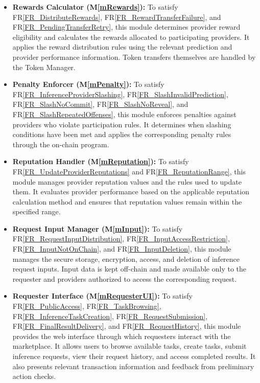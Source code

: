 \documentclass[12pt, titlepage]{article}
\newcommand{\mref}[1]{M\ref{#1}}
\newcommand{\rref}[1]{FR\ref{#1}}
\begin{document}
\begin{itemize}
    \item \textbf{Rewards Calculator (\mref{mRewards}):}
    To satisfy \rref{FR_DistributeRewards},
    \rref{FR_RewardTransferFailure}, and
    \rref{FR_PendingTransferRetry}, this module determines provider
    reward eligibility and calculates the rewards allocated to
    participating providers. It applies the reward distribution rules
    using the relevant prediction and provider performance information.
    Token transfers themselves are handled by the Token Manager.

    \item \textbf{Penalty Enforcer (\mref{mPenalty}):}
    To satisfy \rref{FR_InferenceProviderSlashing},
    \rref{FR_SlashInvalidPrediction},
    \rref{FR_SlashNoCommit},
    \rref{FR_SlashNoReveal}, and
    \rref{FR_SlashRepeatedOffenses}, this module enforces penalties
    against providers who violate participation rules. It determines
    when slashing conditions have been met and applies the corresponding
    penalty rules through the on-chain program.

    \item \textbf{Reputation Handler (\mref{mReputation}):}
    To satisfy \rref{FR_UpdateProviderReputations} and
    \rref{FR_ReputationRange}, this module manages provider reputation
    values and the rules used to update them. It evaluates provider
    performance based on the applicable reputation calculation method
    and ensures that reputation values remain within the specified
    range.

    \item \textbf{Request Input Manager (\mref{mInput}):}
    To satisfy \rref{FR_RequestInputDistribution},
    \rref{FR_InputAccessRestriction},
    \rref{FR_InputNotOnChain}, and
    \rref{FR_InputDeletion}, this module manages the secure storage,
    encryption, access, and deletion of inference request inputs.
    Input data is kept off-chain and made available only to the
    requester and providers authorized to access the corresponding
    request.

    \item \textbf{Requester Interface (\mref{mRequesterUI}):}
    To satisfy \rref{FR_PublicAccess},
    \rref{FR_TaskBrowsing},
    \rref{FR_InferenceTaskCreation},
    \rref{FR_RequestSubmission},
    \rref{FR_FinalResultDelivery}, and
    \rref{FR_RequestHistory}, this module provides the web interface
    through which requesters interact with the marketplace. It allows
    users to browse available tasks, create tasks, submit inference
    requests, view their request history, and access completed results.
    It also presents relevant transaction information and feedback
    from preliminary action checks.


\end{itemize}
\end{document}
